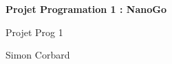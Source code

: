 \documentclass[11pt,a4paper]{article}
\begin{document}
\begin{titlepage}

\vspace{1cm}

	\begin{center}

    \huge{\textbf{Projet Programation 1 : NanoGo}}

		\vspace{5mm} %

		\begin{large}

		Projet Prog 1

		\vspace{5mm}

		Simon Corbard

		\end{large}

	\end{center}

\vfill

\tableofcontents

\end{titlepage}
\end{document}
